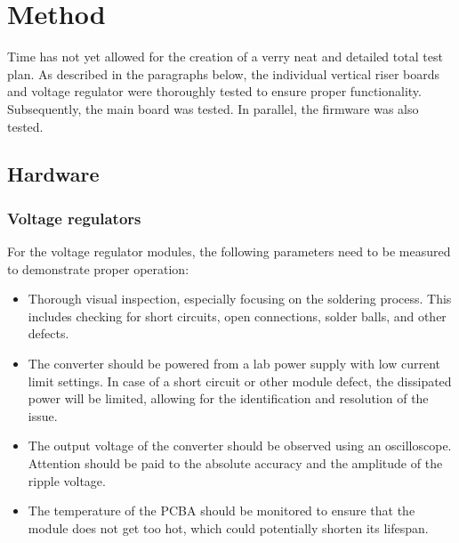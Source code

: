 \section{Method}
Time has not yet allowed for the creation of a verry neat and detailed total test plan. As described in the paragraphs below, the individual vertical riser boards and voltage regulator were thoroughly tested to ensure proper functionality. Subsequently, the main board was tested. In parallel, the firmware was also tested.

\subsection{Hardware}
\subsubsection{Voltage regulators}
For the voltage regulator modules, the following parameters need to be measured to demonstrate proper operation:
\begin{itemize}
\item Thorough visual inspection, especially focusing on the soldering process. This includes checking for short circuits, open connections, solder balls, and other defects.
\item The converter should be powered from a lab power supply with low current limit settings. In case of a short circuit or other module defect, the dissipated power will be limited, allowing for the identification and resolution of the issue.
\item The output voltage of the converter should be observed using an oscilloscope. Attention should be paid to the absolute accuracy and the amplitude of the ripple voltage.
\item The temperature of the PCBA should be monitored to ensure that the module does not get too hot, which could potentially shorten its lifespan.
\end{itemize}  

